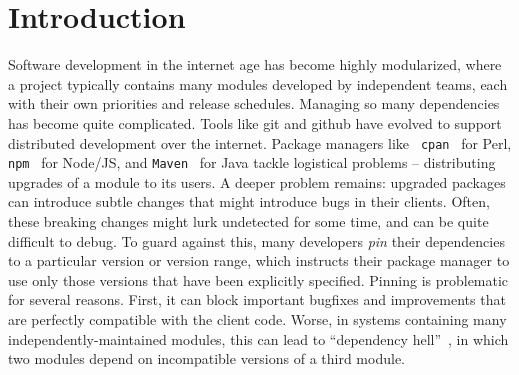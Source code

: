 \section{Introduction}

Software development in the internet age has become highly
modularized, where a project typically contains many modules developed
by independent teams, each with their own priorities and release
schedules. Managing so many dependencies has become quite
complicated. Tools like git and github have evolved to support
distributed development over the internet. Package managers like {\tt
  cpan}~\cite{cpan} for Perl, {\tt npm}~\cite{npm} for Node/JS, and
{\tt Maven}~\cite{maven} for Java tackle logistical problems --
distributing upgrades of a module to its users. A deeper problem
remains: upgraded packages can introduce subtle changes that might
introduce bugs in their clients. Often, these breaking changes might
lurk undetected for some time, and can be quite difficult to debug. To
guard against this, many developers {\em pin} their dependencies to a
particular version or version range, which instructs their package
manager to use only those versions that have been explicitly
specified. Pinning is problematic for several reasons.
%
First, it can block important bugfixes and improvements that are
perfectly compatible with the client code.
%
Worse, in systems containing many independently-maintained modules,
this can lead to ``dependency hell''~\cite{hell}, in which two modules
depend on incompatible versions of a third module.


